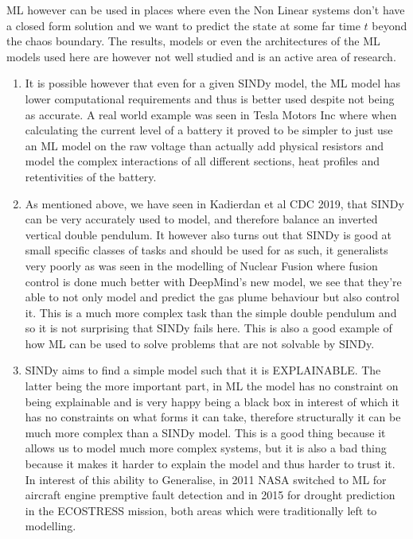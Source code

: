\documentclass[hidelinks]{book}
\numberwithin{equation}{section}
\begin{document}
ML however can be used in places where even the Non Linear systems don't have a closed form solution and we want to predict the state at some far time $t$ beyond the chaos boundary. The results, models or even the architectures of the ML models used here are however not well studied and is an active area of research.
\begin{enumerate}
  \item It is possible however that even for a given SINDy model, the ML model
  has lower computational requirements and thus is better used despite not
  being as accurate. A real world example was seen in Tesla Motors Inc
  where when calculating the current level of a battery it proved to be
  simpler to just use an ML model on the raw voltage than actually add
  physical resistors and model the complex interactions of all different
  sections, heat profiles and retentivities of the battery.
  \item As mentioned above, we have seen in Kadierdan et al CDC 2019, that SINDy
  can be very accurately used to model, and therefore balance an inverted
  vertical double pendulum. It however also turns out that SINDy is good
  at small specific classes of tasks and should be used for as such, it
  generalists very poorly as was seen in the modelling of Nuclear Fusion
  where fusion control is done much better with DeepMind's new model,
  we see that they're able to not only model and predict the gas plume
  behaviour but also control it. This is a much more complex task than the
  simple double pendulum and so it is not surprising that SINDy fails
  here. This is also a good example of how ML can be used to solve
  problems that are not solvable by SINDy.
  \item SINDy aims to find a simple model such that it is EXPLAINABLE. The
  latter being the more important part, in ML the model has no constraint
  on being explainable and is very happy being a black box in interest of
  which it has no constraints on what forms it can take, therefore
  structurally it can be much more complex than a SINDy model. This is a
  good thing because it allows us to model much more complex systems, but
  it is also a bad thing because it makes it harder to explain the model
  and thus harder to trust it. In interest of this ability to Generalise,
  in 2011 NASA switched to ML for aircraft engine premptive fault
  detection and in 2015 for drought prediction in the ECOSTRESS mission,
  both areas which were traditionally left to modelling.
\end{enumerate}
\end{document}
